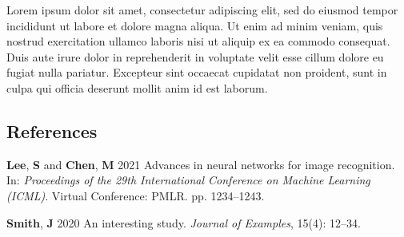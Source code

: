 \documentclass[
]{article}
\newlength{\cslhangindent}
\newenvironment{CSLReferences}[2] %
 {\begin{list}{}{%
  \setlength{\itemindent}{0pt}
  \setlength{\leftmargin}{0pt}
  \setlength{\parsep}{0pt}
  \ifodd #1
   \setlength{\leftmargin}{\cslhangindent}
   \setlength{\itemindent}{-1\cslhangindent}
  \fi
  \setlength{\itemsep}{#2\baselineskip}}}
 {\end{list}}
\begin{document}
Lorem ipsum dolor sit amet, consectetur adipiscing elit, sed do eiusmod
tempor incididunt ut labore et dolore magna aliqua. Ut enim ad minim
veniam, quis nostrud exercitation ullamco laboris nisi ut aliquip ex ea
commodo consequat. Duis aute irure dolor in reprehenderit in voluptate
velit esse cillum dolore eu fugiat nulla pariatur. Excepteur sint
occaecat cupidatat non proident, sunt in culpa qui officia deserunt
mollit anim id est laborum.

\subsection*{References}\label{references}

\protect{}\label{refs}
\begin{CSLReferences}{0}{0}
\textbf{Lee}, \textbf{S} and \textbf{Chen}, \textbf{M} 2021 Advances in
neural networks for image recognition. In: \emph{Proceedings of the 29th
International Conference on Machine Learning (ICML)}. Virtual
Conference: PMLR. pp. 1234--1243.

\textbf{Smith}, \textbf{J} 2020 An interesting study. \emph{Journal of
Examples}, 15(4): 12--34.

\end{CSLReferences}
\end{document}
